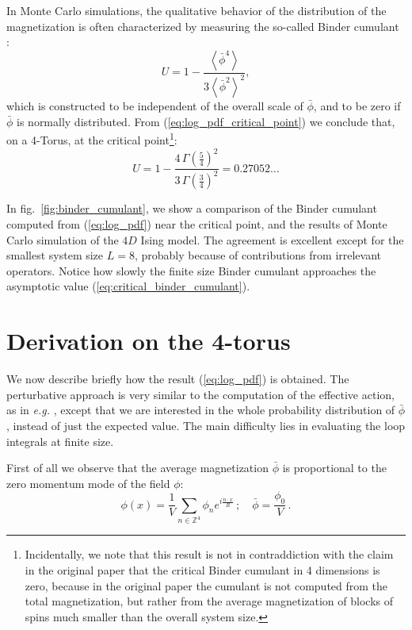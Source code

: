 \documentclass[11pt,a4paper]{article}
\begin{document}
In Monte Carlo simulations, the qualitative behavior of the distribution of the
magnetization is often characterized by measuring the so-called Binder
cumulant \cite{Binder1981}:
\begin{equation}
    U = 1 - \frac{\left\langle \bar \phi^4 \right \rangle}
    {3\left\langle \bar \phi^2 \right \rangle^2},
\end{equation}
which is constructed to be independent of the overall scale of $\bar{\phi}$,
and to be zero if $\bar{\phi}$ is normally distributed. From
(\ref{eq:log_pdf_critical_point}) we conclude that, on a 4-Torus, at the
critical point\footnote{ Incidentally, we note that this result is not in
contraddiction with the claim in the original paper \cite{Binder1981} that the
critical Binder cumulant in 4 dimensions is zero, because in the original paper
the cumulant is not computed from the total magnetization, but rather from the
average magnetization of blocks of spins much smaller than the overall system
size.}:
\begin{equation}
    \label{eq:critical_binder_cumulant}
    U = 1 - \frac{4\,\Gamma\left(\frac{5}{4}\right)^2}
    {3\,\Gamma\left(\frac{3}{4}\right)^2} 
    = 0.27052\ldots
\end{equation}


In fig.~\ref{fig:binder_cumulant}, we show a comparison of the Binder cumulant
computed from (\ref{eq:log_pdf}) near the critical point, and the results of
Monte Carlo simulation of the $4D$ Ising model. The agreement is excellent except
for the smallest system size $L = 8$, probably because of contributions from
irrelevant operators. Notice how slowly the finite size Binder cumulant
approaches the asymptotic value (\ref{eq:critical_binder_cumulant}).

\section{Derivation on the 4-torus}

We now describe briefly how the result (\ref{eq:log_pdf}) is obtained. The
perturbative approach is very similar to the computation of the effective
action, as in \textit{e.g.} \cite{WeinbergEffectiveAction}, except that we are
interested in the whole probability distribution of $\bar{\phi}$, instead of
just the expected value. The main difficulty lies in evaluating the loop
integrals at finite size.

First of all we observe that the average magnetization
$\bar{\phi}$ is proportional to the zero momentum mode of the field $\phi$:
\begin{equation}
    \phi(x) = \frac{1}{V} \sum_{n \in \mathbb{Z}^4} \phi_{n} 
    e^{i \frac{n\cdot x}{R}}\,;\quad \bar{\phi} = \frac{\phi_{0}}{V}\,.
\end{equation}
\end{document}
